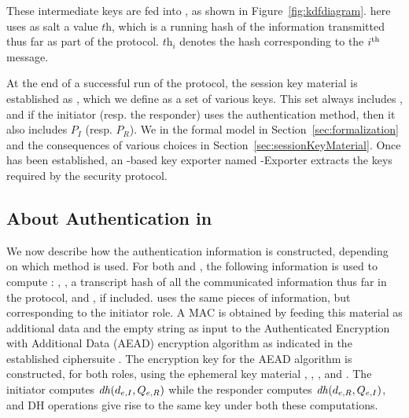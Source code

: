 These intermediate keys are fed into \mHkdfExpand{}, as shown in 
Figure~\ref{fig:kdfdiagram}.
%
\mHkdfExpand{} here uses as salt a value $\textit{th}$, which is a running 
hash of the information transmitted thus far as part of the protocol.
%
$\textit{th}_{i}$ denotes the hash corresponding to the $i^{\rm{th}}$ message.
%

At the end of a successful run of the protocol, the session key material is
established as \mSessKey{}, which we define as a set of various keys.
%
This set always includes \mGxy{}, and if the initiator (resp. the responder) uses 
the \mStat{} authentication method, then it also includes $P_{I}$ (resp. 
$P_{R}$).
%
We 
in
the formal model in Section~\ref{sec:formalization} and the consequences of
various choices in Section~\ref{sec:sessionKeyMaterial}.
%
Once \mSessKey{} has been established, an \mHkdf{}-based key exporter 
named
\mEdhoc-Exporter extracts the keys required by the security protocol.
%

\subsection{About Authentication in \mEdhoc{}}
\label{sec:edhocauth}
We now describe how the authentication information is constructed, 
depending on which method is used.
%
For both \mStat{} and \mSig{}, the following information is used to compute
\mAuthr{}: \mIdcredr{}, \mCredr{}, a transcript hash of all the communicated
information thus far in the protocol, and \mADtwo{}, if included.
%
\mAuthi{} uses the same pieces of information, but corresponding to the
initiator role.
%
A MAC is obtained by feeding this material as additional data and the empty
string as input to the Authenticated Encryption with Additional Data (AEAD)
encryption algorithm as indicated in the established ciphersuite \mSuites{}.
%
The encryption key for the AEAD algorithm is constructed, for both roles,
using the ephemeral key material \mGx{}, \mGy{}, \mX{}, and \mY{}.
%
The initiator computes $\mathit{dh}(d_{e,I}, Q_{e,R})$ while the responder computes
$\mathit{dh}(d_{e,R}, Q_{e,I})$, and DH operations give rise to the same key under both
these computations.
%

